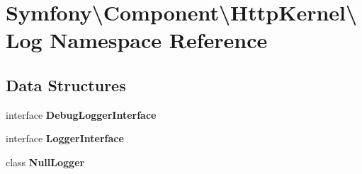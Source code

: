 \section{Symfony\textbackslash{}Component\textbackslash{}Http\+Kernel\textbackslash{}Log Namespace Reference}
\label{namespace_symfony_1_1_component_1_1_http_kernel_1_1_log}
\subsection*{Data Structures}
\begin{DoxyCompactItemize}
\item 
interface {\bf Debug\+Logger\+Interface}
\item 
interface {\bf Logger\+Interface}
\item 
class {\bf Null\+Logger}
\end{DoxyCompactItemize}
